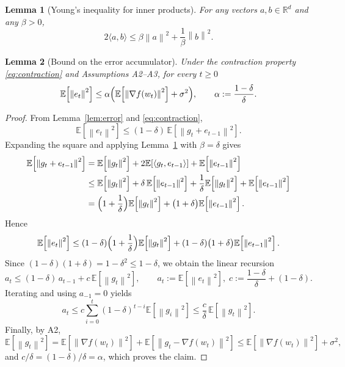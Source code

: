 \documentclass{article}
\newtheorem{lemma}{Lemma}
\newcommand{\E}{\mathbb{E}}
\newcommand{\R}{\mathbb{R}}
\newcommand{\norm}[1]{\left\lVert#1\right\rVert}
\begin{document}
\begin{lemma}[Young’s inequality for inner products]\label{lem:young}
For any vectors $a,b\in\R^{d}$ and any $\beta>0$,
\[
2\langle a,b\rangle\le\beta\norm{a}^{2}+\frac{1}{\beta}\norm{b}^{2}.
\]
\end{lemma}

\begin{lemma}[Bound on the error accumulator]\label{lem:errorbound}
Under the contraction property \eqref{eq:contraction} and Assumptions
A2–A3, for every $t\ge0$
\[
\E\!\left[\norm{e_t}^{2}\right]\le
\alpha\Bigl(\E\!\left[\norm{\nabla f(w_t)}^{2}\right]+\sigma^{2}\Bigr),
\qquad\alpha:=\frac{1-\delta}{\delta}.
\]
\end{lemma}
\begin{proof}
From Lemma~\ref{lem:error} and \eqref{eq:contraction},
\[
\E\!\left[\norm{e_t}^{2}\right]
 \le (1-\delta)\,\E\!\left[\norm{g_t+e_{t-1}}^{2}\right].
\]
Expanding the square and applying Lemma~\ref{lem:young} with
$\beta=\delta$ gives
\[
\begin{aligned}
\E\!\left[\norm{g_t+e_{t-1}}^{2}\right]
&= \E\!\left[\norm{g_t}^{2}\right]
   +2\E\!\left[\langle g_t,e_{t-1}\rangle\right]
   +\E\!\left[\norm{e_{t-1}}^{2}\right] \\
&\le \E\!\left[\norm{g_t}^{2}\right]
   +\delta\,\E\!\left[\norm{e_{t-1}}^{2}\right]
   +\frac{1}{\delta}\E\!\left[\norm{g_t}^{2}\right]
   +\E\!\left[\norm{e_{t-1}}^{2}\right] \\
&= \Bigl(1+\frac{1}{\delta}\Bigr)\E\!\left[\norm{g_t}^{2}\right]
   +\bigl(1+\delta\bigr)\E\!\left[\norm{e_{t-1}}^{2}\right].
\end{aligned}
\]
Hence
\[
\E\!\left[\norm{e_t}^{2}\right]
\le (1-\delta)\Bigl(1+\frac{1}{\delta}\Bigr)\E\!\left[\norm{g_t}^{2}\right]
   +(1-\delta)\bigl(1+\delta\bigr)\E\!\left[\norm{e_{t-1}}^{2}\right].
\]
Since $(1-\delta)(1+\delta)=1-\delta^{2}\le 1-\delta$, we obtain the linear
recursion
\[
a_t\le (1-\delta)\,a_{t-1}+c\,\E\!\left[\norm{g_t}^{2}\right],
\qquad
a_t:=\E\!\left[\norm{e_t}^{2}\right],
\;c:=\frac{1-\delta}{\delta}+ (1-\delta).
\]
Iterating and using $a_{-1}=0$ yields
\[
a_t\le c\sum_{i=0}^{t}(1-\delta)^{t-i}\E\!\left[\norm{g_i}^{2}\right]
\le \frac{c}{\delta}\,\E\!\left[\norm{g_t}^{2}\right].
\]
Finally, by A2,
\[
\E\!\left[\norm{g_t}^{2}\right]
= \E\!\left[\norm{\nabla f(w_t)}^{2}\right]
  +\E\!\left[\norm{g_t-\nabla f(w_t)}^{2}\right]
\le \E\!\left[\norm{\nabla f(w_t)}^{2}\right]+\sigma^{2},
\]
and $c/\delta = (1-\delta)/\delta = \alpha$, which proves the claim.
\end{proof}
\end{document}
